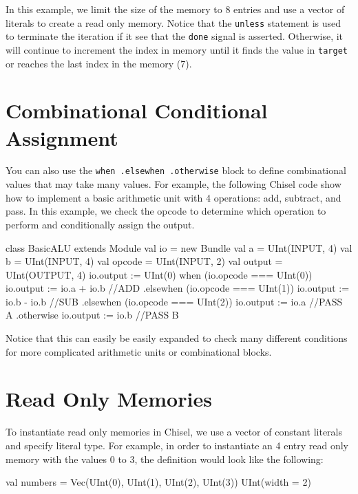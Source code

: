 \documentclass[twocolumn, 10pt]{article}
\begin{document}
In this example, we limit the size of the memory to 8 entries and use a vector of literals to create a read only memory. Notice that the \verb+unless+ statement is used to terminate the iteration if it see that the \verb+done+ signal is asserted. Otherwise, it will continue to increment the index in memory until it finds the value in \verb+target+ or reaches the last index in the memory (7).

\section{Combinational Conditional Assignment}

You can also use the \verb+when .elsewhen .otherwise+ block to define combinational values that may take many values. For example, the following Chisel code show how to implement a basic arithmetic unit with 4 operations: add, subtract, and pass. In this example, we check the opcode to determine which operation to perform and conditionally assign the output.

\begin{scala}
class BasicALU extends Module {
  val io = new Bundle {
    val a      = UInt(INPUT, 4)
    val b      = UInt(INPUT, 4)
    val opcode = UInt(INPUT, 2)
    val output = UInt(OUTPUT, 4)
  }
  io.output := UInt(0) 
  when (io.opcode === UInt(0)) {
    io.output := io.a + io.b   //ADD
  } .elsewhen (io.opcode === UInt(1)) {
    io.output := io.b - io.b   //SUB
  } .elsewhen (io.opcode === UInt(2)) {
    io.output := io.a  	       //PASS A
  } .otherwise {
    io.output := io.b          //PASS B
  }
}
\end{scala}

Notice that this can easily be easily expanded to check many different conditions for more complicated arithmetic units or combinational blocks.

\section{Read Only Memories}

To instantiate read only memories in Chisel, we use a vector of constant literals and specify literal type. For example, in order to instantiate an 4 entry read only memory with the values 0 to 3, the definition would look like the following:

\begin{scala}
val numbers = Vec(UInt(0), UInt(1), UInt(2), UInt(3)){ UInt(width = 2) }
\end{scala}
\end{document}

